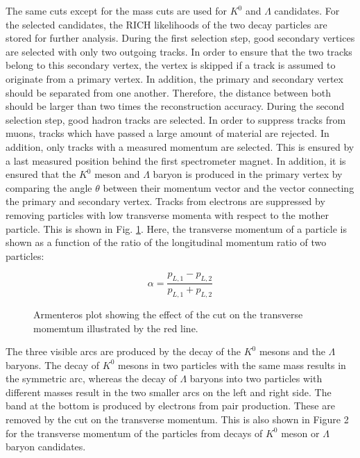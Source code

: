 The same cuts except for the mass cuts are used for $K^0$ and $\Lambda$ candidates. For the selected candidates, the RICH likelihoods of the two decay particles are stored for further analysis. During the first selection step, good secondary vertices are selected with only two outgoing tracks. In order to ensure that the two tracks belong to this secondary vertex, the vertex is skipped if a track is assumed to originate from a primary vertex. In addition, the primary and secondary vertex should be separated from one another. Therefore, the distance between both should be larger than two times the reconstruction accuracy.
During the second selection step, good hadron tracks are selected. In order to suppress tracks from muons, tracks which have passed a large amount of material are rejected. In addition, only tracks with a measured momentum are selected. This is ensured by a last measured position behind the first spectrometer magnet. In addition, it is ensured that the $K^0$ meson and $\Lambda$ baryon is produced in the primary vertex by comparing the angle $\theta$ between their momentum vector and the vector connecting the primary and secondary vertex. Tracks from electrons are suppressed by removing particles with low transverse momenta with respect to the mother particle. This is shown in Fig. \ref{pic:Armenteros}. Here, the transverse momentum of a particle is shown as a function of the ratio of the longitudinal momentum ratio of two particles:

\begin{equation}
  \alpha = \frac{p_{L,1}-p_{L,2}}{p_{L,1}+p_{L,2}}
\end{equation}

\begin{figure}[!h]
  \centering
	\caption{Armenteros plot showing the effect of the cut on the transverse momemtum illustrated by the red line.}
	\label{pic:Armenteros}
\end{figure}

The three visible arcs are produced by the decay of the $K^0$ mesons and the $\Lambda$ baryons. The decay of $K^0$ mesons in two particles with the same mass results in the symmetric arc, whereas the decay of $\Lambda$ baryons into two particles with different masses result in the two smaller arcs on the left and right side. The band at the bottom is produced by electrons from pair production. These are removed by the cut on the transverse momentum. This is also shown in Figure 2 for the transverse momentum of the particles from decays of $K^0$ meson or $\Lambda$ baryon candidates.

